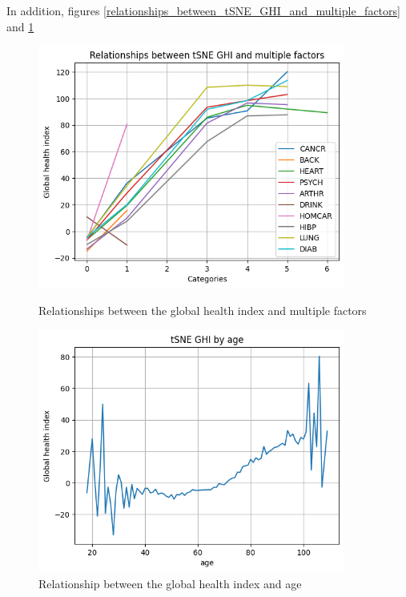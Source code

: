 \documentclass[]{article}
\begin{document}
\noindent
In addition, figures \ref{relationships_between_tSNE_GHI_and_multiple_factors} and \ref{tSNE_GHI_by_age} 
\begin{figure}[!h]
	\centering
	\begin{minipage}{0.45\textwidth}
	\centering
		\includegraphics[width=0.9\textwidth]{relationships_between_tSNE_GHI_and_multiple_factors.png}
		\caption{Relationships between the global health index and multiple factors}
		\label{relationships_between_tSNE_GHI_and_multiple_factors}
	\end{minipage}\hfill
	\begin{minipage}{0.45\textwidth}
		\centering
		\includegraphics[width=0.9\textwidth]{tSNE_GHI_by_age.png}
		\caption{Relationship between the global health index and age}
		\label{tSNE_GHI_by_age}
	\end{minipage}
\end{figure}
\end{document}
